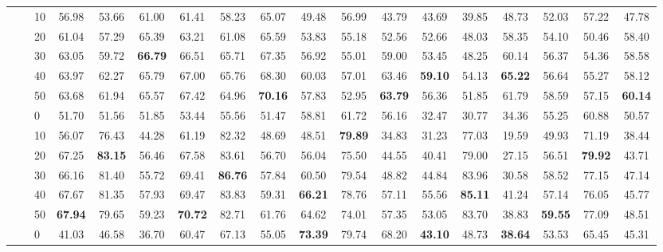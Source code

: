 \begin{table*}[!h]
{\begin{tabular}{lllccc|ccc|ccc|ccc|ccc}
 \textbf{} & \textbf{} & 10 & 56.98 & 53.66 & 61.00 & 61.41 & 58.23 & 65.07 & 49.48 & 56.99 & 43.79 & 43.69 & 39.85 & 48.73 & 52.03 & 57.22 & 47.78 \\ 
 \textbf{} & \textbf{} & 20 & 61.04 & 57.29 & 65.39 & 63.21 & 61.08 & 65.59 & 53.83 & 55.18 & 52.56 & 52.66 & 48.03 & 58.35 & 54.10 & 50.46 & 58.40 \\ 
 \textbf{} & \textbf{} & 30 & 63.05 & 59.72 & \textbf{66.79} & 66.51 & 65.71 & 67.35 & 56.92 & 55.01 & 59.00 & 53.45 & 48.25 & 60.14 & 56.37 & 54.36 & 58.58 \\ 
 \textbf{} & \textbf{} & 40 & 63.97 & 62.27 & 65.79 & 67.00 & 65.76 & 68.30 & 60.03 & 57.01 & 63.46 & \textbf{59.10} & 54.13 & \textbf{65.22} & 56.64 & 55.27 & 58.12 \\ 
 \textbf{} & \textbf{} & 50 & 63.68 & 61.94 & 65.57 & 67.42 & 64.96 & \textbf{70.16} & 57.83 & 52.95 & \textbf{63.79} & 56.36 & 51.85 & 61.79 & 58.59 & 57.15 & \textbf{60.14} \\ 
 \arrayrulecolor{gray}\cline{2-18}\arrayrulecolor{black}
\textbf{} & \textbf{\multirow{6}{*}{SC}} & 0 & 51.70 & 51.56 & 51.85 & 53.44 & 55.56 & 51.47 & 58.81 & 61.72 & 56.16 & 32.47 & 30.77 & 34.36 & 55.25 & 60.88 & 50.57 \\ 
 \textbf{} & \textbf{} & 10 & 56.07 & 76.43 & 44.28 & 61.19 & 82.32 & 48.69 & 48.51 & \textbf{79.89} & 34.83 & 31.23 & 77.03 & 19.59 & 49.93 & 71.19 & 38.44 \\ 
 \textbf{} & \textbf{} & 20 & 67.25 & \textbf{83.15} & 56.46 & 67.58 & 83.61 & 56.70 & 56.04 & 75.50 & 44.55 & 40.41 & 79.00 & 27.15 & 56.51 & \textbf{79.92} & 43.71 \\ 
 \textbf{} & \textbf{} & 30 & 66.16 & 81.40 & 55.72 & 69.41 & \textbf{86.76} & 57.84 & 60.50 & 79.54 & 48.82 & 44.84 & 83.96 & 30.58 & 58.52 & 77.15 & 47.14 \\ 
 \textbf{} & \textbf{} & 40 & 67.67 & 81.35 & 57.93 & 69.47 & 83.83 & 59.31 & \textbf{66.21} & 78.76 & 57.11 & 55.56 & \textbf{85.11} & 41.24 & 57.14 & 76.05 & 45.77 \\ 
 \textbf{} & \textbf{} & 50 & \textbf{67.94} & 79.65 & 59.23 & \textbf{70.72} & 82.71 & 61.76 & 64.62 & 74.01 & 57.35 & 53.05 & 83.70 & 38.83 & \textbf{59.55} & 77.09 & 48.51 \\ 
\hline
\arrayrulecolor{gray}\cline{2-18}\arrayrulecolor{black}
\textbf{\multirow{12}{*}{Aspect Category}} & \textbf{\multirow{6}{*}{-}} & 0 & 41.03 & 46.58 & 36.70 & 60.47 & 67.13 & 55.05 & \textbf{73.39} & 79.74 & 68.20 & \textbf{43.10} & 48.73 & \textbf{38.64} & 53.53 & 65.45 & 45.31 \\ 

\end{tabular}}
\end{table*}
